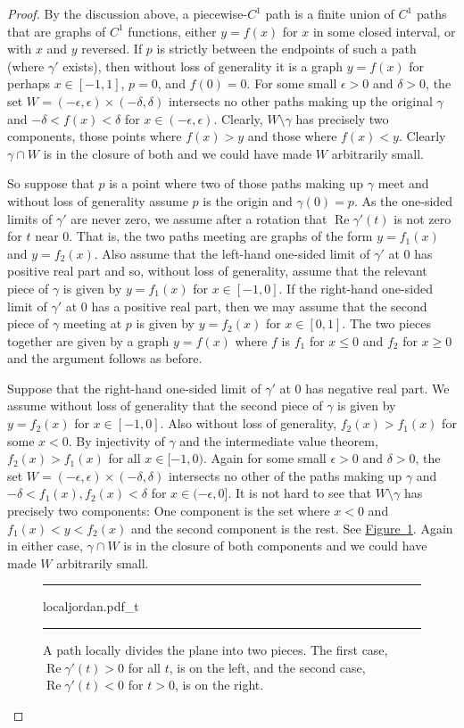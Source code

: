 \documentclass[12pt,openany]{book}
\renewcommand{\Re}{\operatorname{Re}}
\theoremstyle{plain}
\theoremstyle{remark}
\theoremstyle{definition}
\newenvironment{myfig}{%
\begin{figure}[h!t]
\noindent\rule{\textwidth}{0.5pt}\vspace{12pt}\par\centering}%
{\par\noindent\rule{\textwidth}{0.5pt}
\end{figure}}
\theoremstyle{exercise}
\theoremstyle{example}
\newcommand{\figureref}[1]{\hyperref[#1]{Figure~\ref*{#1}}}
\begin{document}
\begin{proof}
By the discussion above, a piecewise-$C^1$ path is a finite union of $C^1$
paths that are graphs of $C^1$ functions, either $y=f(x)$
for $x$ in some closed interval, or with $x$ and $y$ reversed.
If $p$ is strictly between the endpoints of such a path (where $\gamma'$ exists),
then without loss of generality it is a graph $y=f(x)$ for perhaps
$x \in [-1,1]$, $p=0$, and $f(0)=0$.
For some small $\epsilon > 0$ and $\delta > 0$,
the set $W = (-\epsilon,\epsilon) \times (-\delta,\delta)$
intersects no other paths making up the original $\gamma$ and $-\delta < f(x) <
\delta$ for $x \in (-\epsilon,\epsilon)$.  Clearly,
$W \setminus \gamma$ has precisely two components,
those points where $f(x) > y$ and those where $f(x) < y$.
Clearly $\gamma \cap W$ is in the closure of both and we could
have made $W$ arbitrarily small.

So suppose that $p$ is a point where two of those paths making up $\gamma$
meet and without loss of generality assume $p$ is the origin and 
$\gamma(0) = p$.
As the one-sided limits of $\gamma'$ are never zero, we assume after
a rotation that $\Re \gamma'(t)$ is not zero for 
$t$ near $0$.
That is, the two
paths meeting are graphs of the form $y=f_1(x)$ and $y=f_2(x)$.
Also assume  that the
left-hand one-sided limit of $\gamma'$ at $0$ has positive real part and so,
without loss of generality, assume that
the relevant piece of $\gamma$ is given by $y=f_1(x)$
for $x \in [-1,0]$.
If the right-hand one-sided limit of $\gamma'$ at $0$ has a positive real part,
then we may assume that the second piece of $\gamma$
meeting at $p$ is given by
$y=f_2(x)$ for $x \in [0,1]$.
The two pieces together are given by a graph $y=f(x)$ where $f$ is $f_1$
for $x \leq 0$ and $f_2$ for $x\geq 0$ and the argument follows as
before.

Suppose that the right-hand one-sided limit of $\gamma'$ at $0$
has negative real part.  We assume without loss of generality
that the second piece of
$\gamma$ is given by $y=f_2(x)$ for $x \in [-1,0]$.
Also without loss of generality, $f_2(x) > f_1(x)$
for some $x < 0$.
By injectivity of $\gamma$ and the intermediate value
theorem, $f_2(x) > f_1(x)$ for all $x \in [-1,0)$.
Again for some small $\epsilon > 0$ and $\delta > 0$,
the set
$W = (-\epsilon,\epsilon) \times (-\delta,\delta)$
intersects no other of the paths making up $\gamma$
and
$-\delta < f_1(x), f_2(x) < \delta$ for $x \in (-\epsilon,0]$.
It is not hard to see that $W \setminus \gamma$
has precisely two components:
One component is the set
where
$x < 0$ and $f_1(x) < y < f_2(x)$
and the second component is the rest.
See \figureref{fig:localjordan}.
Again in either case,
$\gamma \cap W$ is in the closure of both components and we could
have made $W$ arbitrarily small.
\begin{myfig}
{localjordan.pdf_t}
\caption{A path locally divides the plane into two pieces.
The first case, $\Re \gamma'(t) > 0$ for all $t$, is on the left,
and the second case,
$\Re \gamma'(t) < 0$ for $t > 0$, is on the right.
\label{fig:localjordan}}
\end{myfig}
\end{proof}
\end{document}
